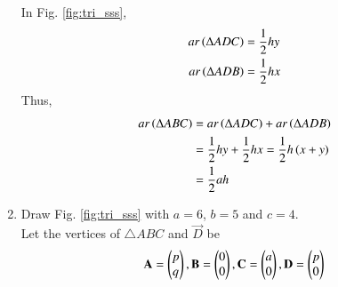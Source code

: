 \begin{enumerate}[label=\arabic*.,ref=\thesubsection.\theenumi]
\solution In Fig. \ref{fig:tri_sss},
\begin{align}
ar\left(\Delta ADC\right) &= \frac{1}{2}hy \\
ar\left(\Delta ADB\right) &= \frac{1}{2}hx 
\end{align}
Thus,
\begin{align}
ar\left(\Delta ABC\right) &= ar\left(\Delta ADC\right) + ar\left(\Delta ADB\right) \\
&= \frac{1}{2}hy + \frac{1}{2}hx = \frac{1}{2}h\left(x+y\right) \\
&= \frac{1}{2}ah
\end{align}
%
\item Draw Fig. \ref{fig:tri_sss} with $a=6$, $b=5$  and $c=4$.  
\label{const:tri_sss}
\\
\solution Let the vertices of  $\triangle ABC$ and $\vec{D}$ be 
\begin{align}
\label{eq:tri_basic}
\mathbf{A} = \begin{pmatrix}p\\q\end{pmatrix}, \mathbf{B} = \begin{pmatrix}0\\0\end{pmatrix}, \mathbf{C} = \begin{pmatrix}a\\0\end{pmatrix}, \mathbf{D} = \begin{pmatrix}p\\0\end{pmatrix}
\end{align}
%


\end{enumerate}
